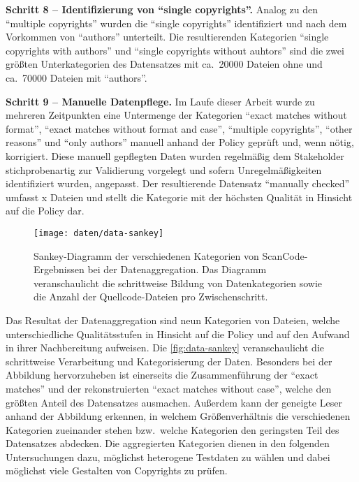 \textbf{Schritt 8 -- Identifizierung von \enquote{single copyrights}.}
Analog zu den \enquote{multiple copyrights} wurden die \enquote{single copyrights} identifiziert und nach dem Vorkommen von \enquote{authors} unterteilt.
Die resultierenden Kategorien \enquote{single copyrights with authors} und \enquote{single copyrights without auhtors} sind die zwei größten Unterkategorien des Datensatzes mit ca.\ \num{20000} Dateien ohne und ca.\ \num{70000} Dateien mit \enquote{authors}.

\textbf{Schritt 9 -- Manuelle Datenpflege.}
Im Laufe dieser Arbeit wurde zu mehreren Zeitpunkten eine Untermenge der Kategorien \enquote{exact matches without format}, \enquote{exact matches without format and case}, \enquote{multiple copyrights}, \enquote{other reasons} und \enquote{only authors} manuell anhand der Policy geprüft und, wenn nötig, korrigiert.
Diese manuell gepflegten Daten wurden regelmäßig dem Stakeholder stichprobenartig zur Validierung vorgelegt und sofern Unregelmäßigkeiten identifiziert wurden, angepasst.
Der resultierende Datensatz \enquote{manually checked} umfasst x Dateien und stellt die Kategorie mit der höchsten Qualität in Hinsicht auf die Policy dar.

\begin{figure}[ht]
    \centering
    \texttt{[image: daten/data-sankey]}
    \caption{Sankey-Diagramm der verschiedenen Kategorien von ScanCode-Ergebnissen bei der Datenaggregation. Das Diagramm veranschaulicht die schrittweise Bildung von Datenkategorien sowie die Anzahl der Quellcode-Dateien pro Zwischenschritt.}
    \label{fig:data-sankey}
\end{figure}
Das Resultat der Datenaggregation sind neun Kategorien von Dateien, welche unterschiedliche Qualitätsstufen in Hinsicht auf die Policy und auf den Aufwand in ihrer Nachbereitung aufweisen.
Die \autoref{fig:data-sankey} veranschaulicht die schrittweise Verarbeitung und Kategorisierung der Daten.
Besonders bei der Abbildung hervorzuheben ist einerseits die Zusammenführung der \enquote{exact matches} und der rekonstruierten \enquote{exact matches without case}, welche den größten Anteil des Datensatzes ausmachen.
Außerdem kann der geneigte Leser anhand der Abbildung erkennen, in welchem Größenverhältnis die verschiedenen Kategorien zueinander stehen bzw.\ welche Kategorien den geringsten Teil des Datensatzes abdecken.
Die aggregierten Kategorien dienen in den folgenden Untersuchungen dazu, möglichst heterogene Testdaten zu wählen und dabei möglichst viele Gestalten von Copyrights zu prüfen.

